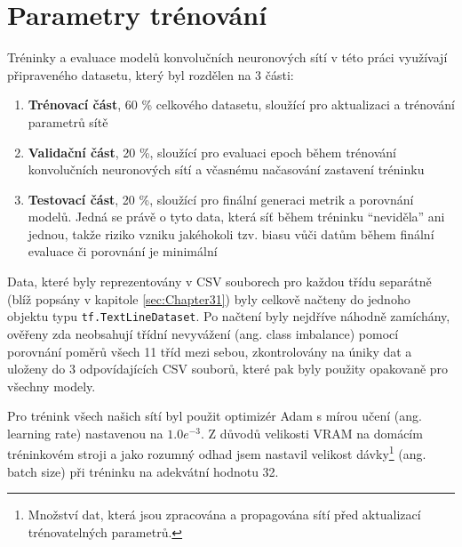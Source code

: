 \section{Parametry trénování}
\label{sec:Chapter53}
Tréninky a evaluace modelů konvolučních neuronových sítí v této práci využívají připraveného datasetu, který byl rozdělen na 3 části:
\begin{enumerate}
    \item \textbf{Trénovací část}, 60 \% celkového datasetu, sloužící pro aktualizaci a trénování parametrů sítě
    \item \textbf{Validační část}, 20 \%, sloužící pro evaluaci epoch během trénování konvolučních neuronových sítí a včasnému načasování zastavení tréninku
    \item \textbf{Testovací část}, 20 \%, sloužící pro finální generaci metrik a porovnání modelů. Jedná se právě o tyto data, která síť během tréninku ``neviděla'' ani jednou, takže riziko vzniku jakéhokoli tzv. biasu vůči datům během finální evaluace či porovnání je minimální
\end{enumerate}

Data, které byly reprezentovány v CSV souborech pro každou třídu separátně (blíž popsány v kapitole \ref{sec:Chapter31}) byly celkově načteny do jednoho objektu typu \texttt{tf.TextLineDataset}. Po načtení byly nejdříve náhodně zamíchány, ověřeny zda neobsahují třídní nevyvážení (ang. class imbalance) pomocí porovnání poměrů všech 11 tříd mezi sebou, zkontrolovány na úniky dat a uloženy do 3 odpovídajících CSV souborů, které pak byly použity opakovaně pro všechny modely.

Pro trénink všech našich sítí byl použit optimizér Adam s mírou učení (ang. learning rate) nastavenou na $1.0e^{-3}$. Z důvodů velikosti VRAM na domácím tréninkovém stroji a jako rozumný odhad jsem nastavil velikost dávky\footnote{Množství dat, která jsou zpracována a propagována sítí před aktualizací trénovatelných parametrů.} (ang. batch size) při tréninku na adekvátní hodnotu 32.

\endinput